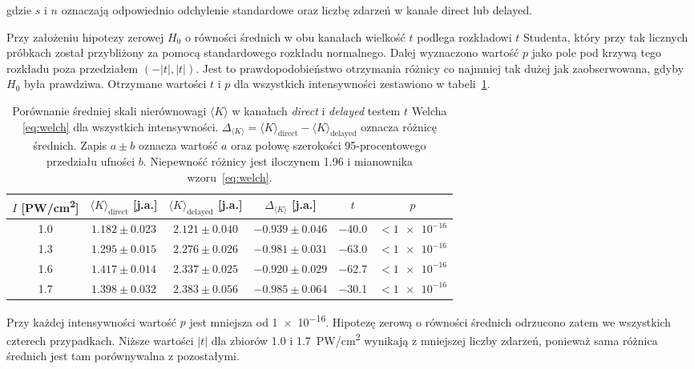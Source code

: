 \documentclass[12pt,a4paper]{article}
\newcommand{\ja}{j.a.}
\newcommand{\PWcm}{PW/cm\textsuperscript{2}}
\begin{document}
gdzie $s$ i $n$ oznaczają odpowiednio odchylenie standardowe oraz liczbę zdarzeń
w kanale direct lub delayed. 

Przy założeniu hipotezy zerowej $H_0$ o równości średnich w obu
kanałach wielkość $t$ podlega rozkładowi $t$ Studenta, który przy tak
licznych próbkach został przybliżony za pomocą standardowego rozkładu normalnego. Dalej wyznaczono wartość $p$ jako pole pod krzywą tego rozkładu
poza przedziałem $(-|t|,|t|)$. Jest to prawdopodobieństwo otrzymania
różnicy co najmniej tak dużej jak zaobserwowana, gdyby $H_0$ była
prawdziwa. Otrzymane wartości $t$ i $p$ dla wszystkich intensywności zestawiono
w tabeli~\ref{tab:welch}.


\begin{table}[htbp]
  \centering
  \caption{Porównanie średniej skali nierównowagi $\langle K\rangle$
  w kanałach \emph{direct} i \emph{delayed} testem $t$ Welcha
  \eqref{eq:welch} dla wszystkich intensywności.
  $\Delta_{\langle K\rangle}=\langle K\rangle_{\mathrm{direct}}-\langle K\rangle_{\mathrm{delayed}}$
  oznacza różnicę średnich. Zapis $a\pm b$ oznacza wartość $a$ oraz
  połowę szerokości 95-procentowego przedziału ufności $b$. Niepewność
  różnicy jest iloczynem \num{1.96} i mianownika wzoru~\eqref{eq:welch}.}
  \label{tab:welch}
  \begin{tabular}{cccccc}
    \toprule
    $I$ [\PWcm] & $\langle K\rangle_{\mathrm{direct}}$ [\ja]
      & $\langle K\rangle_{\mathrm{delayed}}$ [\ja] & $\Delta_{\langle K\rangle}$ [\ja]
      & $t$ & $p$ \\
    \midrule
    \num{1.0} & $\num{1.182}\pm\num{0.023}$ & $\num{2.121}\pm\num{0.040}$ & $\num{-0.939}\pm\num{0.046}$ & \num{-40.0} & $<\num{1e-16}$ \\
    \num{1.3} & $\num{1.295}\pm\num{0.015}$ & $\num{2.276}\pm\num{0.026}$ & $\num{-0.981}\pm\num{0.031}$ & \num{-63.0} & $<\num{1e-16}$ \\
    \num{1.6} & $\num{1.417}\pm\num{0.014}$ & $\num{2.337}\pm\num{0.025}$ & $\num{-0.920}\pm\num{0.029}$ & \num{-62.7} & $<\num{1e-16}$ \\
    \num{1.7} & $\num{1.398}\pm\num{0.032}$ & $\num{2.383}\pm\num{0.056}$ & $\num{-0.985}\pm\num{0.064}$ & \num{-30.1} & $<\num{1e-16}$ \\
    \bottomrule
  \end{tabular}
\end{table}

Przy każdej intensywności wartość $p$ jest mniejsza od \num{1e-16}. Hipotezę zerową o równości średnich odrzucono zatem we wszystkich
czterech przypadkach. Niższe wartości $|t|$ dla zbiorów \num{1.0}
i \num{1.7}~\PWcm{} wynikają z mniejszej liczby zdarzeń, ponieważ sama
różnica średnich jest tam porównywalna z pozostałymi.
\end{document}
